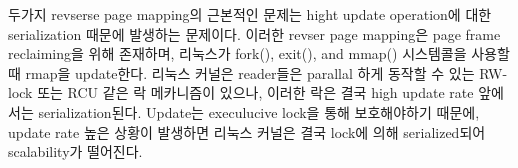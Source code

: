 



















\fi


\ifkor
두가지 revserse page mapping의 근본적인 문제는 hight update operation에 대한 serialization 때문에
발생하는 문제이다.
이러한 revser page mapping은 page frame reclaiming을 위해 존재하며, 리눅스가 fork(), exit(),
and mmap() 시스템콜을 사용할 때 rmap을 update한다.
리눅스 커널은 reader들은 parallal 하게 동작할 수 있는 RW-lock 또는 RCU 같은 락 메카니즘이 있으나, 이러한 락은 결국
high update rate 앞에서는 serialization된다.
Update는 execulucive lock을 통해 보호해야하기 때문에, update rate 높은 상황이 발생하면 리눅스
커널은 결국 lock에 의해 serialized되어 scalability가 떨어진다.
\else

